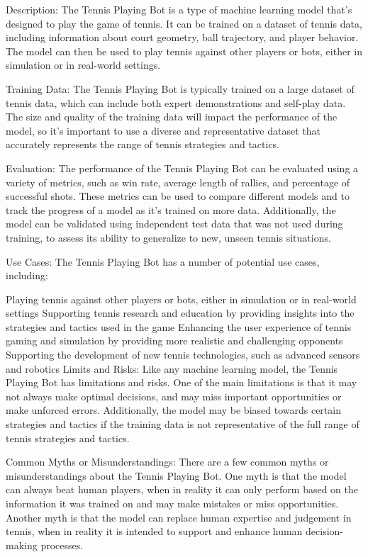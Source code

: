 Description:
The Tennis Playing Bot is a type of machine learning model that's designed to play the game of tennis. It can be trained on a dataset of tennis data, including information about court geometry, ball trajectory, and player behavior. The model can then be used to play tennis against other players or bots, either in simulation or in real-world settings.

Training Data:
The Tennis Playing Bot is typically trained on a large dataset of tennis data, which can include both expert demonstrations and self-play data. The size and quality of the training data will impact the performance of the model, so it's important to use a diverse and representative dataset that accurately represents the range of tennis strategies and tactics.

Evaluation:
The performance of the Tennis Playing Bot can be evaluated using a variety of metrics, such as win rate, average length of rallies, and percentage of successful shots. These metrics can be used to compare different models and to track the progress of a model as it's trained on more data. Additionally, the model can be validated using independent test data that was not used during training, to assess its ability to generalize to new, unseen tennis situations.

Use Cases:
The Tennis Playing Bot has a number of potential use cases, including:

Playing tennis against other players or bots, either in simulation or in real-world settings
Supporting tennis research and education by providing insights into the strategies and tactics used in the game
Enhancing the user experience of tennis gaming and simulation by providing more realistic and challenging opponents
Supporting the development of new tennis technologies, such as advanced sensors and robotics
Limits and Risks:
Like any machine learning model, the Tennis Playing Bot has limitations and risks. One of the main limitations is that it may not always make optimal decisions, and may miss important opportunities or make unforced errors. Additionally, the model may be biased towards certain strategies and tactics if the training data is not representative of the full range of tennis strategies and tactics.

Common Myths or Misunderstandings:
There are a few common myths or misunderstandings about the Tennis Playing Bot. One myth is that the model can always beat human players, when in reality it can only perform based on the information it was trained on and may make mistakes or miss opportunities. Another myth is that the model can replace human expertise and judgement in tennis, when in reality it is intended to support and enhance human decision-making processes.

